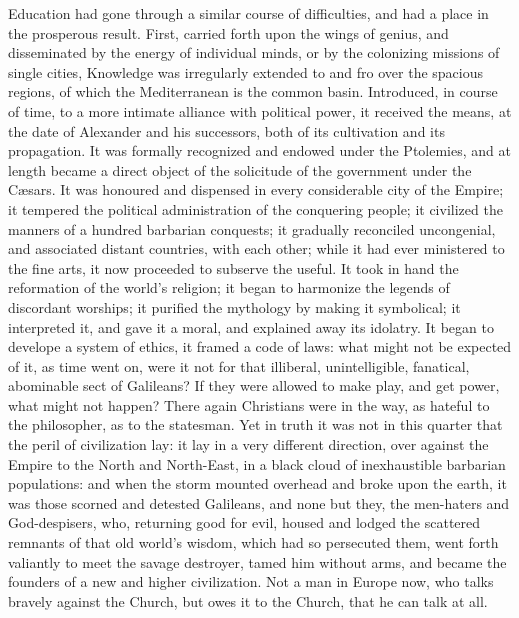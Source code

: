 Education had gone through a similar course of difficulties, and
had a place in the prosperous result. First, carried forth upon the
wings of genius, and disseminated by the energy of individual minds,
or by the colonizing missions of single cities, Knowledge was
irregularly extended to and fro over the spacious regions, of which
the Mediterranean is the common basin. Introduced, in course of time,
to a more intimate alliance with political power, it received the
means, at the date of Alexander and his successors, both of its
cultivation and its propagation. It was formally recognized and
endowed under the Ptolemies, and at length became a direct object of
the solicitude of the government under the Cæsars. It was honoured
and dispensed in every considerable city of the Empire; it tempered
the political administration of the conquering people; it civilized
the manners of a hundred barbarian conquests; it gradually reconciled
uncongenial, and associated distant countries, with each other;
while it had ever ministered to the fine arts, it now proceeded to
subserve the useful. It took in hand the reformation of the world's
religion; it began to harmonize the legends of discordant worships; it
purified the mythology by making it symbolical; it interpreted it, and
gave it a moral, and explained away its idolatry. It began to develope
a system of ethics, it framed a code of laws: what might not be
expected of it, as time went on, were it not for that illiberal,
unintelligible, fanatical, abominable sect of Galileans? If they were
allowed to make play, and get power, what might not happen? There
again Christians were in the way, as hateful to the philosopher, as to
the statesman. Yet in truth it was not in this quarter that the peril
of civilization lay: it lay in a very different direction, over
against the Empire to the North and North-East, in a black cloud of
inexhaustible barbarian populations: and when the storm mounted
overhead and broke upon the earth, it was those scorned and detested
Galileans, and none but they, the men-haters and God-despisers, who,
returning good for evil, housed and lodged the scattered remnants of
that old world's wisdom, which had so persecuted them, went forth
valiantly to meet the savage destroyer, tamed him without arms, and
became the founders of a new and higher civilization. Not a man in
Europe now, who talks bravely against the Church, but owes it to the
Church, that he can talk at all.

